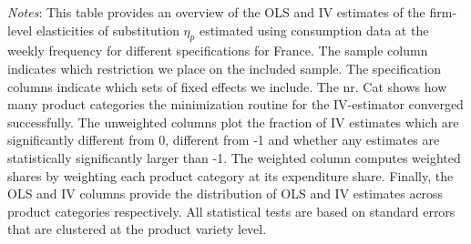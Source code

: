 \begin{landscape}
    \begin{table}[H]
        \centering
        \caption{Weekly Firm-level Elasticities: Dispersion instrument - France}
        \label{tab: app_elas_eta_cats_weekly_q_FR}
        \begin{spacing}{1}
        \end{spacing}
        \parbox{1.2\textwidth}{
        \vspace{10pt}
        \begin{spacing}{1} 
            {\footnotesize 
            \textit{Notes}: This table provides an overview of the OLS and IV estimates of the firm-level elasticities of substitution $\eta_p$ estimated using consumption data at the weekly frequency for different specifications for France. The sample column indicates which restriction we place on the included sample. The specification columns indicate which sets of fixed effects we include. The nr. Cat shows how many product categories the minimization routine for the IV-estimator converged successfully. The unweighted columns plot the fraction of IV estimates which are significantly different from 0, different from -1 and whether any estimates are statistically significantly larger than -1. The weighted column computes weighted shares by weighting each product category at its expenditure share. Finally, the OLS and IV columns provide the distribution of OLS and IV estimates across product categories respectively. All statistical tests are based on standard errors that are clustered at the product variety level.}
            \end{spacing}}
    \end{table}
\end{landscape}

